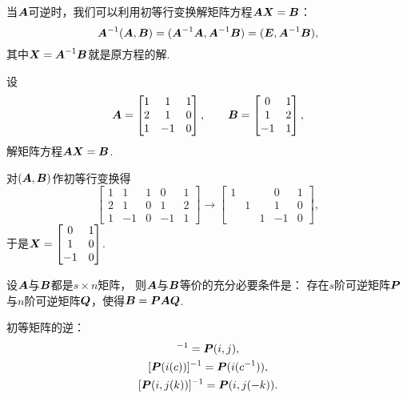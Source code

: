 当\(\boldsymbol{A}\)可逆时，我们可以利用初等行变换解矩阵方程\(\boldsymbol{A} \boldsymbol{X} = \boldsymbol{B}\)：\begin{equation*}
	\boldsymbol{A}^{-1} (\boldsymbol{A},\boldsymbol{B})
	= (\boldsymbol{A}^{-1} \boldsymbol{A},\boldsymbol{A}^{-1} \boldsymbol{B})
	= (\boldsymbol{E},\boldsymbol{A}^{-1} \boldsymbol{B}),
\end{equation*}
其中\(\boldsymbol{X} = \boldsymbol{A}^{-1} \boldsymbol{B}\)就是原方程的解.
\begin{example}
设\begin{equation*}
	\boldsymbol{A} = \begin{bmatrix}
		1 & 1 & 1 \\
		2 & 1 & 0 \\
		1 & -1 & 0
	\end{bmatrix},
	\qquad
	\boldsymbol{B} = \begin{bmatrix}
		0 & 1 \\
		1 & 2 \\
		-1 & 1
	\end{bmatrix},
\end{equation*}
解矩阵方程\(\boldsymbol{A} \boldsymbol{X} = \boldsymbol{B}\).
\begin{solution}
对\((\boldsymbol{A},\boldsymbol{B})\)作初等行变换得\begin{equation*}
	\begin{bmatrix}
		1 & 1 & 1 & 0 & 1 \\
		2 & 1 & 0 & 1 & 2 \\
		1 & -1 & 0 & -1 & 1
	\end{bmatrix}
	\to \begin{bmatrix}
		1 & & & 0 & 1 \\
		& 1 & & 1 & 0 \\
		& & 1 & -1 & 0
	\end{bmatrix},
\end{equation*}
于是\(\boldsymbol{X} = \begin{bmatrix}
	0 & 1 \\
	1 & 0 \\
	-1 & 0
\end{bmatrix}\).
\end{solution}
\end{example}

\begin{theorem}
设\(\boldsymbol{A}\)与\(\boldsymbol{B}\)都是\(s \times n\)矩阵，
则\(\boldsymbol{A}\)与\(\boldsymbol{B}\)等价的充分必要条件是：
存在\(s\)阶可逆矩阵\(\boldsymbol{P}\)与\(n\)阶可逆矩阵\(\boldsymbol{Q}\)，使得\(\boldsymbol{B}=\boldsymbol{P}\boldsymbol{A}\boldsymbol{Q}\).
\end{theorem}

\begin{example}
初等矩阵的逆：\begin{gather*}
	[\vb{P}(i,j)]^{-1}=\vb{P}(i,j), \\
	[\vb{P}(i(c))]^{-1}=\vb{P}(i(c^{-1})), \\
	[\vb{P}(i,j(k))]^{-1}=\vb{P}(i,j(-k)).
\end{gather*}
\end{example}
